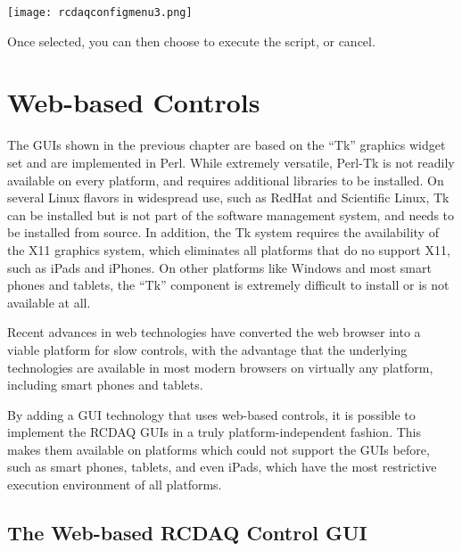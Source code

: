 \documentclass{article}[11pt]
\begin{document}
\begin{center}
\texttt{[image: rcdaqconfigmenu3.png]}
\end{center}

Once selected, you can then choose to execute the script, or cancel. 

\section{Web-based Controls}
\label{webcontrols}

The GUIs shown in the previous chapter are based on the ``Tk''
graphics widget set and are implemented in Perl. While extremely
versatile, Perl-Tk is not readily available on every platform, and
requires additional libraries to be installed. On several Linux
flavors in widespread use, such as RedHat and Scientific Linux, Tk can
be installed but is not part of the software management system, and
needs to be installed from source. In addition, the Tk system requires
the availability of the X11 graphics system, which eliminates all
platforms that do no support X11, such as iPads and iPhones. On other
platforms like Windows and most smart phones and tablets, the ``Tk''
component is extremely difficult to install or is not available at
all.

Recent advances in web technologies have converted the web browser
into a viable platform for slow controls, with the advantage that the
underlying technologies are available in most modern browsers on
virtually any platform, including smart phones and tablets.

By adding a GUI technology that uses web-based controls, it is
possible to implement the RCDAQ GUIs in a truly platform-independent
fashion. This makes them available on platforms which could not
support the GUIs before, such as smart phones, tablets, and even
iPads, which have the most restrictive execution environment of all
platforms.


\subsection{The Web-based RCDAQ Control GUI}
\end{document}

